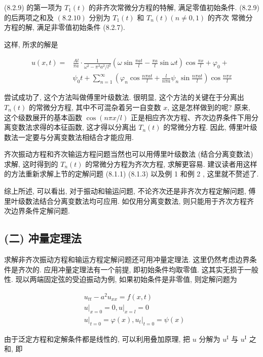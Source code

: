 (8.2.9) 的第一项为 $T_{1}(t)$ 的非齐次常微分方程的特解, 满足零值初始条件. (8.2.9) 的后两项之和及 $(8.2 .10)$ 分别为 $T_{1}(t)$ 和 $T_{n}(t)(n \neq 0,1)$ 的齐次
常微分方程的解, 满足非零值初始条件 (8.2.7).

这样, 所求的解是

$$
\begin{aligned}
u(x, t)= & \frac{A l}{\pi a} \cdot \frac{1}{\omega^{2}-\pi^{2} a^{2} / l^{2}}\left(\omega \sin \frac{\pi a t}{l}-\frac{\pi a}{l} \sin \omega t\right) \cos \frac{\pi x}{l}+\varphi_{0}+ \\
& \psi_{0} t+\sum_{n=1}^{\infty}\left(\varphi_{n} \cos \frac{n \pi a t}{l}+\frac{l}{n \pi a} \psi_{n} \sin \frac{n \pi a t}{l}\right) \cos \frac{n \pi x}{l}
\end{aligned}
$$

尝试成功了, 这个方法叫做傅里叶级数法. 很明显, 这个方法的关键在于分离出 $T_{n}(t)$ 的常微分方程, 其中不可混杂着另一自变数 $x$, 这是怎样做到的呢? 原来, 这个级数展开的基本函数 $\cos (n \pi x / l)$ 正是相应齐次方程、齐次边界条件下用分离变数法求得的本征函数, 这才得以分离出 $T_{n}(t)$ 的常微分方程. 因此, 傅里叶级数法一定要与分离变数法相结合才能应用.

齐次振动方程和齐次输运方程问题当然也可以用傅里叶级数法 (结合分离变数法) 求解, 这时得到的 $T_{n}(t)$ 的常微分方程为齐次方程, 求解更容易. 建议读者用这样的方法重新求解上节的定解问题 (8.1.1) (8.1.3) 以及例 1 和例 2 , 这里就不赘述了.

综上所述, 可以看出, 对于振动和输运问题, 不论齐次还是非齐次方程定解问题, 傅里叶级数法结合分离变数法均可应用. 如仅用分离变数法, 则只能用于齐次方程齐次边界条件定解问题.

\subsection{(二) 冲量定理法}
求解非齐次振动方程和输运方程定解问题还可用冲量定理法. 这里仍然考虑边界条件是齐次的. 应用冲量定理法有一个前提, 即初始条件均取零值. 这其实无损于一般性. 现以两端固定弦的受迫振动为例, 如果初始条件是非零值, 则定解问题为

$$
\begin{aligned}
& u_{t t}-a^{2} u_{x x}=f(x, t) \\
& \left.u\right|_{x=0}=0,\left.u\right|_{x=l}=0 \\
& \left.u\right|_{t=0}=\varphi(x),\left.u_{t}\right|_{t=0}=\psi(x)
\end{aligned}
$$

由于泛定方程和定解条件都是线性的, 可以利用叠加原理, 把 $u$ 分解为 $u^{\mathrm{I}}$ 与 $u^{\mathrm{I}}$ 之和, 即


